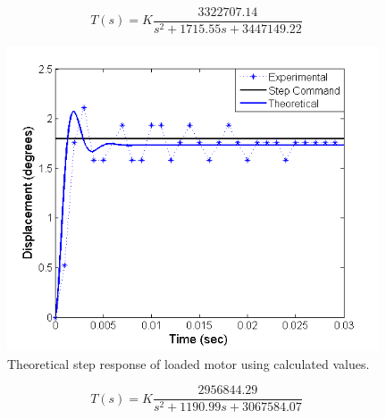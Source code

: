\documentclass{article}
\theoremstyle{plain}
\theoremstyle{definition}
\theoremstyle{remark}
\begin{document}
\begin{equation}
\label{q3ai_B}
T(s) = K \frac{3322707.14}{s^2 + 1715.55 s + 3447149.22}
\end{equation}

\begin{figure}[hbt]
\begin{center}
\includegraphics[width = 11cm]{LoadedStepUnFit.png}
\caption{Theoretical step response of loaded motor using calculated values.}
\label{q3ai_1}
\end{center}
\end{figure}

\begin{equation}
\label{q3ai_C}
T(s) = K \frac{2956844.29}{s^2 + 1190.99 s + 3067584.07}
\end{equation}
\end{document}
